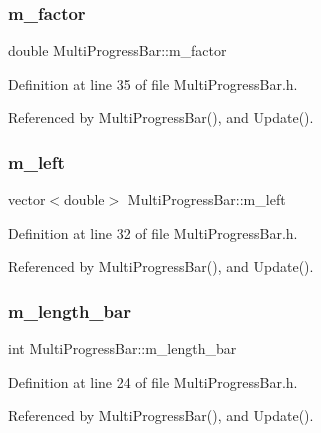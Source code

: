 \subsubsection{m\+\_\+factor}
{\footnotesize\ttfamily double Multi\+Progress\+Bar\+::m\+\_\+factor\hspace{0.3cm}{\ttfamily [private]}}



Definition at line 35 of file Multi\+Progress\+Bar.\+h.



Referenced by Multi\+Progress\+Bar(), and Update().

\mbox{\label{classMultiProgressBar_af1ad5d5306597de5925d69ceda22d3a5_af1ad5d5306597de5925d69ceda22d3a5}} 
\subsubsection{m\+\_\+left}
{\footnotesize\ttfamily vector$<$double$>$ Multi\+Progress\+Bar\+::m\+\_\+left\hspace{0.3cm}{\ttfamily [protected]}}



Definition at line 32 of file Multi\+Progress\+Bar.\+h.



Referenced by Multi\+Progress\+Bar(), and Update().

\mbox{\label{classMultiProgressBar_a0319176f9fc1a3443c2e7d76163d6401_a0319176f9fc1a3443c2e7d76163d6401}} 
\subsubsection{m\+\_\+length\+\_\+bar}
{\footnotesize\ttfamily int Multi\+Progress\+Bar\+::m\+\_\+length\+\_\+bar\hspace{0.3cm}{\ttfamily [protected]}}



Definition at line 24 of file Multi\+Progress\+Bar.\+h.



Referenced by Multi\+Progress\+Bar(), and Update().

\mbox{\label{classMultiProgressBar_a12795fa634323457d1cacfc8a2beec12_a12795fa634323457d1cacfc8a2beec12}} 
